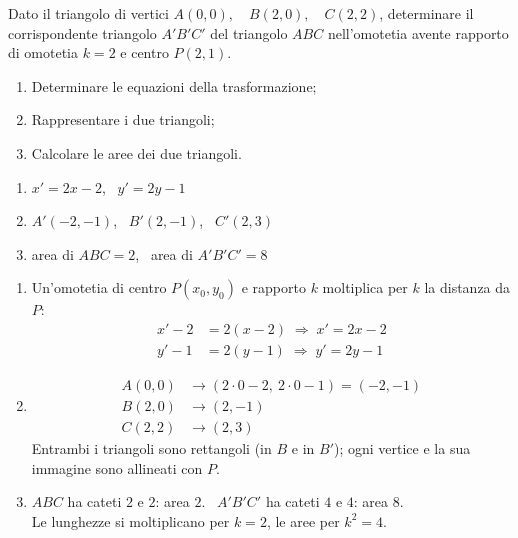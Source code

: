 

\begin{question}[ID=3.1, subtitle={Omotetia con centro $P(2,1)$ e rapporto $k=2$ sul triangolo $ABC$}, tags={trasformazioni geometriche, omotetia}, difficulty=media]
Dato il triangolo di vertici $A(0,0), \quad B(2,0), \quad C(2,2)$, determinare il corrispondente triangolo $A'B'C'$ del triangolo $ABC$ nell'omotetia avente rapporto di omotetia $k=2$ e centro $P(2,1)$.
\begin{enumerate}
\item Determinare le equazioni della trasformazione;
\item Rappresentare i due triangoli;
\item Calcolare le aree dei due triangoli.
\end{enumerate}
\begin{solution}
\begin{enumerate}
    \item $x'=2x-2$, \ $y'=2y-1$
    \item $A'(-2,-1)$, \ $B'(2,-1)$, \ $C'(2,3)$
    \item area di $ABC=2$, \ area di $A'B'C'=8$
\end{enumerate}
\end{solution}
\begin{explanation}
\begin{enumerate}
    \item Un'omotetia di centro $P(x_0,y_0)$ e rapporto $k$ moltiplica per $k$ la distanza da $P$:
    \[\begin{aligned}
    x'-2 &= 2(x-2) \;\Rightarrow\; x'=2x-2\\
    y'-1 &= 2(y-1) \;\Rightarrow\; y'=2y-1
    \end{aligned}\]
    \item \[\begin{aligned}
    A(0,0) &\to (2\cdot0-2,\ 2\cdot0-1)=(-2,-1)\\
    B(2,0) &\to (2,-1)\\
    C(2,2) &\to (2,3)
    \end{aligned}\]
    Entrambi i triangoli sono rettangoli (in $B$ e in $B'$); ogni vertice e la sua immagine sono allineati con $P$.
    \item $ABC$ ha cateti $2$ e $2$: area $2$. \ $A'B'C'$ ha cateti $4$ e $4$: area $8$. \\
    Le lunghezze si moltiplicano per $k=2$, le aree per $k^2=4$.
\end{enumerate}
\end{explanation}
\end{question}


